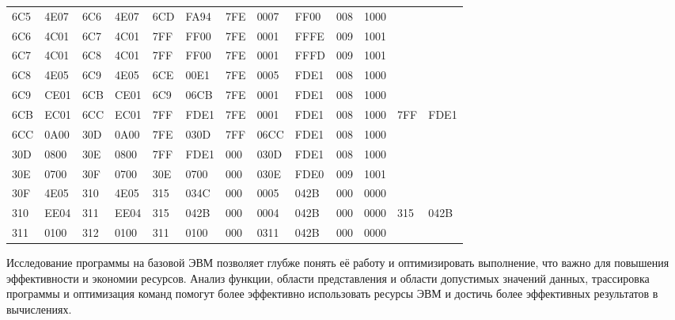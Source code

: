 \documentclass[14pt]{extreport}
\begin{document}
\begin{landscape}
\begin{table}[!h]
            \end{table}
            \begin{table}[h]
                \centering
                \begin{tabular}{|l|l|l|l|l|l|l|l|l|l|l|l|l|}
                    \hline
                    6C5 & 4E07 & 6C6 & 4E07 & 6CD & FA94 & 7FE & 0007 & FF00 & 008 & 1000 &&\\
                    6C6 & 4C01 & 6C7 & 4C01 & 7FF & FF00 & 7FE & 0001 & FFFE & 009 & 1001 &&\\
                    6C7 & 4C01 & 6C8 & 4C01 & 7FF & FF00 & 7FE & 0001 & FFFD & 009 & 1001 &&\\
                    6C8 & 4E05 & 6C9 & 4E05 & 6CE & 00E1 & 7FE & 0005 & FDE1 & 008 & 1000 &&\\
                    6C9 & CE01 & 6CB & CE01 & 6C9 & 06CB & 7FE & 0001 & FDE1 & 008 & 1000 &&\\
                    6CB & EC01 & 6CC & EC01 & 7FF & FDE1 & 7FE & 0001 & FDE1 & 008 & 1000 & 7FF & FDE1 \\
                    6CC & 0A00 & 30D & 0A00 & 7FE & 030D & 7FF & 06CC & FDE1 & 008 & 1000 && \\
                    30D & 0800 & 30E & 0800 & 7FF & FDE1 & 000 & 030D & FDE1 & 008 & 1000 &&\\
                    30E & 0700 & 30F & 0700 & 30E & 0700 & 000 & 030E & FDE0 & 009 & 1001 &&\\
                    30F & 4E05 & 310 & 4E05 & 315 & 034C & 000 & 0005 & 042B & 000 & 0000 &&\\
                    310 & EE04 & 311 & EE04 & 315 & 042B & 000 & 0004 & 042B & 000 & 0000 & 315 & 042B \\
                    311 & 0100 & 312 & 0100 & 311 & 0100 & 000 & 0311 & 042B & 000 & 0000 &&\\
                    \hline
                \end{tabular}
                \end{table}
        \end{landscape}


    \conclusions Исследование программы на базовой ЭВМ позволяет глубже понять её работу и оптимизировать выполнение, что важно для повышения эффективности и экономии ресурсов. Анализ функции, области представления и области допустимых значений данных, трассировка программы и оптимизация команд помогут более эффективно использовать ресурсы ЭВМ и достичь более эффективных результатов в вычислениях.
\end{document}

